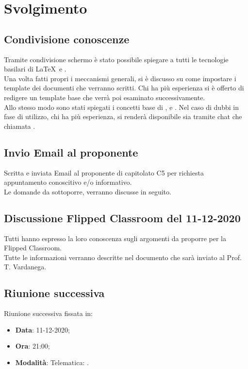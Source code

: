 \documentclass[]{article}
\begin{document}
\newpage

\section{Svolgimento}
	\subsection{Condivisione conoscenze}
	Tramite condivisione schermo è stato possibile spiegare a tutti le tecnologie basilari di \LaTeX\ e . \\
	Una volta fatti propri i meccanismi generali, si è discusso su come impostare i template dei documenti che verranno scritti. Chi ha più esperienza si è offerto di redigere un template base che verrà poi esaminato successivamente.\\
	Allo stesso modo sono stati spiegati i concetti base di ,  e . Nel caso di dubbi in fase di utilizzo, chi ha più esperienza, si renderà disponibile sia tramite chat che chiamata .\\

	\subsection{Invio Email al proponente}
	Scritta e inviata Email al proponente di capitolato C5 per richiesta appuntamento conoscitivo e/o informativo. \\
	Le domande da sottoporre, verranno discusse in seguito.\\

	\subsection{Discussione Flipped Classroom del 11-12-2020}
	Tutti hanno espresso la loro conoscenza sugli argomenti da proporre per la Flipped Classroom.\\
	Tutte le informazioni verranno descritte nel documento che sarà inviato al Prof. T. Vardanega.\\

	\subsection{Riunione successiva}
	Riunione successiva fissata in:
	\begin{itemize}
		\item \textbf{Data}: 11-12-2020;
		\item \textbf{Ora}: 21:00;
		\item \textbf{Modalità}: Telematica: .
	\end{itemize}
\end{document}
